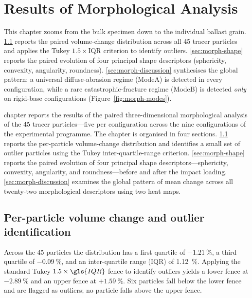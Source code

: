 \chapter[Morphology Results]{Results of Morphological Analysis}
\label{chap:morph-results}


\begin{chapterpreview}
This chapter zooms from the bulk specimen down to the individual
ballast grain. \cref{sec:morph-volume} reports the paired
volume-change distribution across all 45 tracer particles and applies
the Tukey $1.5\times$\gls{IQR} criterion to identify outliers.
\cref{sec:morph-shape} reports the paired evolution of four principal
shape descriptors (sphericity, convexity, angularity, roundness).
\cref{sec:morph-discussion} synthesises the global pattern: a
universal diffuse-abrasion regime (\gls{ModeA}) is detected in every
configuration, while a rare catastrophic-fracture regime (\gls{ModeB})
is detected \emph{only} on rigid-base configurations
(Figure~\ref{fig:morph-modes}).
\end{chapterpreview}

 chapter reports the results of the paired three-dimensional
morphological analysis of the 45 tracer particles---five per configuration
across the nine configurations of the experimental programme. The chapter is
organised in four sections. \cref{sec:morph-volume} reports the
per-particle volume-change distribution and identifies a small set of
outlier particles using the Tukey inter-quartile-range criterion.
\cref{sec:morph-shape} reports the paired evolution of four principal shape
descriptors---sphericity, convexity, angularity, and roundness---before and
after the impact loading. \cref{sec:morph-discussion} examines the global
pattern of mean change across all twenty-two morphological descriptors using
two heat maps.

\section{Per-particle volume change and outlier identification}
\label{sec:morph-volume}

Across the 45 particles the \dV{} distribution has a first quartile of
$-\SI{1.21}{\percent}$, a third quartile of $-\SI{0.09}{\percent}$, and an
inter-quartile range (\gls{IQR}) of \SI{1.12}{\percent}. Applying the
standard Tukey $1.5\times\gls{IQR}$ fence to identify outliers yields a
lower fence at $-\SI{2.89}{\percent}$ and an upper fence at
$+\SI{1.59}{\percent}$. Six particles fall below the lower fence and are
flagged as outliers; no particle falls above the upper fence.

